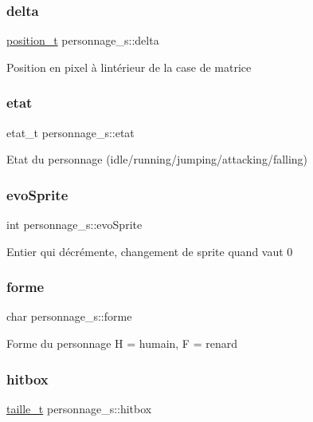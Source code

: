 \subsubsection{\texorpdfstring{delta}{delta}}
{\footnotesize\ttfamily \hyperlink{structposition__s}{position\+\_\+t} personnage\+\_\+s\+::delta}

Position en pixel à l\textquotesingle{}intérieur de la case de matrice \mbox{\label{structpersonnage__s_a2d91f0a1a2e44164875be806c7a456cc}} 
\subsubsection{\texorpdfstring{etat}{etat}}
{\footnotesize\ttfamily etat\+\_\+t personnage\+\_\+s\+::etat}

Etat du personnage (idle/running/jumping/attacking/falling) \mbox{\label{structpersonnage__s_a47750ce89c5dcdb6844e0a98afd5fd75}} 
\subsubsection{\texorpdfstring{evo\+Sprite}{evoSprite}}
{\footnotesize\ttfamily int personnage\+\_\+s\+::evo\+Sprite}

Entier qui décrémente, changement de sprite quand vaut 0 \mbox{\label{structpersonnage__s_a1f1eb200420640259201a84300bccf7e}} 
\subsubsection{\texorpdfstring{forme}{forme}}
{\footnotesize\ttfamily char personnage\+\_\+s\+::forme}

Forme du personnage H = humain, F = renard \mbox{\label{structpersonnage__s_a4a6fd4db944c59eaf1c4006f7e0b533c}} 
\subsubsection{\texorpdfstring{hitbox}{hitbox}}
{\footnotesize\ttfamily \hyperlink{structtaille__s}{taille\+\_\+t} personnage\+\_\+s\+::hitbox}


